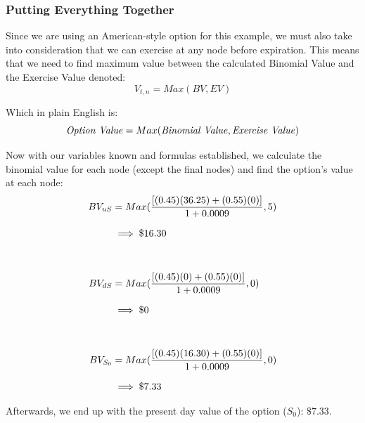 \documentclass[12pt, letterpaper]{article}
\begin{document}
\subsubsection*{Putting Everything Together}
Since we are using an American-style option for this example, we must also take into consideration that we can exercise at any node before expiration.
This means that we need to find maximum value between the calculated Binomial Value and the Exercise Value denoted:
\begin{equation*}
  V_{t,n} = Max({BV, EV})
\end{equation*}

Which in plain English is:
\begin{equation*}
  \textrm{\textit{Option Value}} = Max(\textrm{\textit{Binomial Value}}, \textrm{\textit{Exercise Value}})
\end{equation*}


Now with our variables known and formulas established, we calculate the binomial value for each node (except the final nodes) and find the option's value at each node:
\begin{equation*}
  \setlength{\jot}{10pt}
  \begin{split}
    BV_{uS}
    & = Max(\frac{[(0.45)(36.25) + (0.55)(0)]}{1+0.0009}, 5)
    \\
    & \implies \$16.30
    \\
    \\
    BV_{dS}
    & = Max(\frac{[(0.45)(0) + (0.55)(0)]}{1+0.0009}, 0)
    \\
    & \implies \$0
    \\
    \\
    BV_{S_0}
    & = Max(\frac{[(0.45)(16.30) + (0.55)(0)]}{1+0.0009}, 0)
    \\
    & \implies \$7.33
  \end{split}
\end{equation*}

Afterwards, we end up with the present day value of the option (${S_0}$): ${\$7.33}$.

\pagebreak
\end{document}

